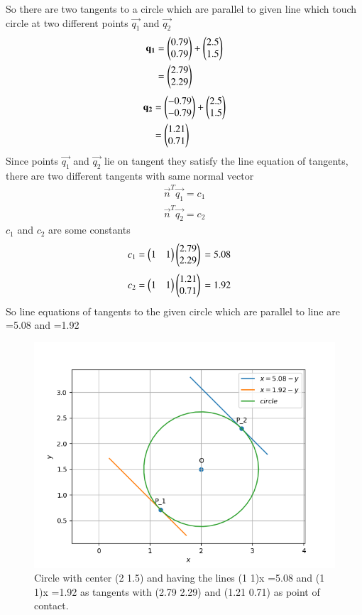 \documentclass[journal,12pt,twocolumn]{IEEEtran}
\begin{document}
So there are two tangents to a circle which are parallel to given line which touch circle at two different points  $\vec{q_1}$ and $\vec{q_2}$
\begin{align}
\mathbf{q_1} &= \begin{pmatrix}0.79 \\ 0.79\end{pmatrix} + \begin{pmatrix}2.5 \\ 1.5\end{pmatrix} \\
&= \begin{pmatrix}2.79 \\ 2.29\end{pmatrix}
\end{align}
\begin{align}
\mathbf{q_2} &= \begin{pmatrix}-0.79 \\ -0.79\end{pmatrix} + \begin{pmatrix}2.5 \\ 1.5\end{pmatrix} \\
&= \begin{pmatrix}1.21 \\ 0.71\end{pmatrix}
\end{align}
Since points $\vec{q_1}$ and $\vec{q_2}$ lie on tangent they satisfy the line equation of tangents, there are two different tangents with same normal vector
\begin{align}
\vec{n}^T\vec{q_1} = c_1 \label{eq1}
\end{align}
\begin{align}
\vec{n}^T\vec{q_2} = c_2 \label{eq1}
\end{align}
$c_1$ and $c_2$ are some constants
\begin{align}
c_1=\myvec{1 & 1}\myvec{2.79 \\ 2.29}\newline
&= 5.08
\end{align}
\newline
\begin{align}
c_2=\myvec{1 & 1}\myvec{1.21 \\ 0.71}\newline
&= 1.92
\end{align}
So line equations of tangents to the given circle which are parallel to line are
=5.08 and =1.92 

\begin{figure}[!ht]
\centering
\includegraphics[width=\columnwidth]{Figure_1.png}
\caption{Circle with center (2 1.5) and having the lines (1 1)x =5.08 and (1 1)x =1.92 as tangents with (2.79 2.29) and (1.21 0.71) as point of contact.}
\label{Fig:Circle}
\end{figure}
\end{document}
